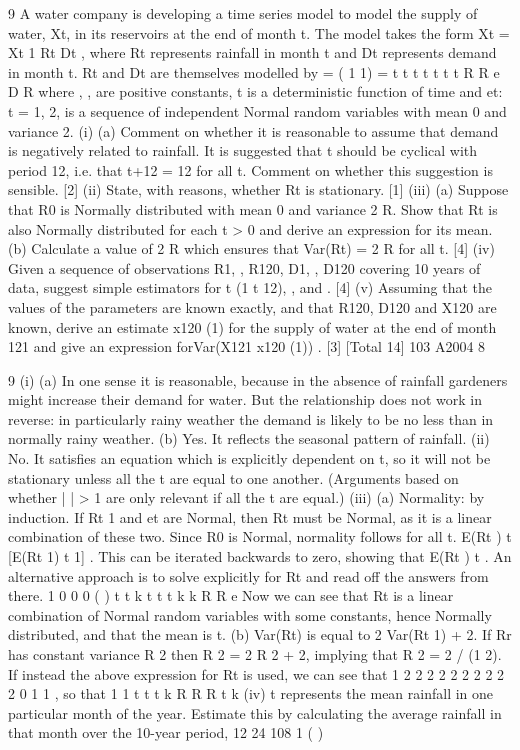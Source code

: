 
9 A water company is developing a time series model to model the supply of water, Xt,
in its reservoirs at the end of month t. The model takes the form
Xt = Xt 1 Rt Dt ,
where Rt represents rainfall in month t and Dt represents demand in month t. Rt and
Dt are themselves modelled by
= ( 1 1)
=
t t t t t
t t
R R e
D R
where , , are positive constants, t is a deterministic function of time and
{et: t = 1, 2, } is a sequence of independent Normal random variables with mean 0
and variance 2.
(i) (a) Comment on whether it is reasonable to assume that demand is
negatively related to rainfall.
It is suggested that t should be cyclical with period 12, i.e. that
t+12 = 12 for all t. Comment on whether this suggestion is sensible.
[2]
(ii) State, with reasons, whether Rt is stationary. [1]
(iii) (a) Suppose that R0 is Normally distributed with mean 0 and variance 2
R.
Show that Rt is also Normally distributed for each t > 0 and derive an
expression for its mean.
(b) Calculate a value of 2
R which ensures that Var(Rt) = 2
R for all t. [4]
(iv) Given a sequence of observations R1, , R120, D1, , D120 covering 10 years
of data, suggest simple estimators for t (1 t 12), , and . [4]
(v) Assuming that the values of the parameters are known exactly, and that R120,
D120 and X120 are known, derive an estimate x120 (1) for the supply of water at
the end of month 121 and give an expression forVar(X121 x120 (1)) . [3]
[Total 14]
103 A2004 8

9 (i) (a) In one sense it is reasonable, because in the absence of rainfall
gardeners might increase their demand for water. But the relationship
does not work in reverse: in particularly rainy weather the demand is
likely to be no less than in normally rainy weather.
(b) Yes. It reflects the seasonal pattern of rainfall.
(ii) No. It satisfies an equation which is explicitly dependent on t, so it will not be
stationary unless all the t are equal to one another. (Arguments based on
whether | | > 1 are only relevant if all the t are equal.)
(iii) (a) Normality: by induction. If Rt 1 and et are Normal, then Rt must be
Normal, as it is a linear combination of these two. Since R0 is Normal,
normality follows for all t.
E(Rt ) t [E(Rt 1) t 1] . This can be iterated backwards to
zero, showing that E(Rt ) t .
An alternative approach is to solve explicitly for Rt and read off the
answers from there.
1
0 0
0
( )
t
t k
t t t k
k
R R e
Now we can see that Rt is a linear combination of Normal random
variables with some constants, hence Normally distributed, and that the
mean is t.
(b) Var(Rt) is equal to 2 Var(Rt 1) + 2. If Rr has constant variance R
2
then R
2 = 2
R
2 + 2, implying that R
2 = 2 / (1 2).
If instead the above expression for Rt is used, we can see that
1 2
2 2 2 2 2 2 2
2 2
0
1 1
, so that
1 1
t t
t k
R R R t
k
(iv) t represents the mean rainfall in one particular month of the year. Estimate
this by calculating the average rainfall in that month over the 10-year period,
12 24 108
1
( )
